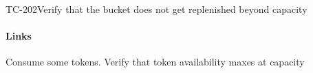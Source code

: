 \begin{testcase}{TC-202}{Verify that the bucket does not get replenished beyond capacity}
\label{TC-202}
\paragraph{Links} 

\begin{testprocedure}
    \stage Consume some tokens.
    \stage Verify that token availability maxes at capacity
\end{testprocedure}
\end{testcase}
